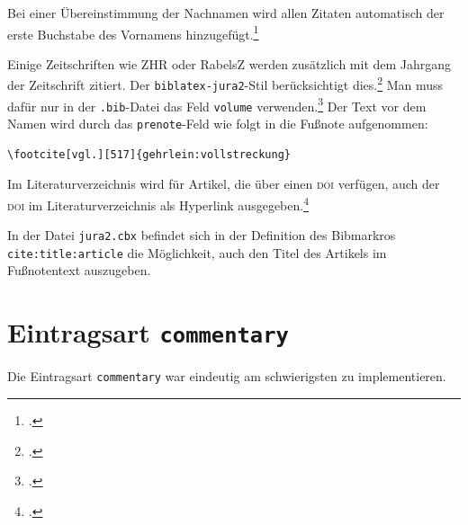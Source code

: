 \documentclass[headings=small,numbers=noenddot, 12pt,oneside]{scrartcl}
\begin{document}
Bei einer Übereinstimmung der Nachnamen wird allen  Zitaten automatisch der erste Buchstabe des Vornamens hinzugefügt.\footcite[125]{stamm:dritter}

Einige Zeitschriften wie ZHR oder RabelsZ werden zusätzlich mit dem Jahrgang der Zeitschrift zitiert. Der \texttt{biblatex-jura2}-Stil berücksichtigt dies.\footcite[vgl.][431]{hellgardt:ar} Man muss dafür nur in der \texttt{.bib}-Datei das Feld \texttt{volume} verwenden.\footcite[a.\,A.][5]{vierautoren} Der Text vor dem Namen wird durch das \texttt{prenote}-Feld wie folgt in die Fußnote aufgenommen: 
\begin{verbatim}
\footcite[vgl.][517]{gehrlein:vollstreckung}
\end{verbatim}
Im Literaturverzeichnis wird für Artikel, die über einen \textsc{doi} verfügen, auch der \textsc{doi} im Literaturverzeichnis als Hyperlink ausgegeben.\footcite[vgl.][517]{gehrlein:vollstreckung}

In der Datei \texttt{jura2.cbx} befindet sich in der Definition des Bibmarkros \texttt{{cite:title:article}} die Möglichkeit, auch den Titel des Artikels im Fußnotentext auszugeben.

\printbibliography[type=article, title={Das Literaturverzeichnis für \texttt{article} sieht so aus:},heading=subbibliography,]

\section{Eintragsart \texttt{commentary}}
Die Eintragsart \texttt{commentary} war eindeutig am schwierigsten zu implementieren. 
\end{document}
